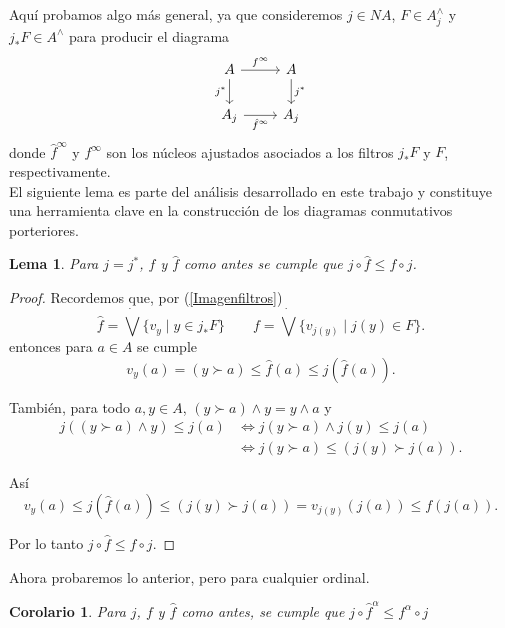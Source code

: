 \documentclass[11pt]{amsart}
\theoremstyle{plain}
\newtheorem{cor}[thm]{Corolario}
\newtheorem{lem}[thm]{Lema}
\theoremstyle{definition}
\begin{document}
Aquí probamos algo más general, ya que consideremos $j\in NA$, $F\in A_j^\wedge$ y $j_*F\in A^\wedge$ para producir el diagrama
\[\begin{tikzcd}
	A & A \\
	{A_j} & {A_j}
	\arrow["{f^\infty}", from=1-1, to=1-2]
	\arrow["j^*"', from=1-1, to=2-1]
	\arrow["j^*", from=1-2, to=2-2]
	\arrow["{\hat{f}^\infty}"', from=2-1, to=2-2]
\end{tikzcd}\]
donde $\hat{f}^\infty$ y $f^\infty$ son los núcleos ajustados asociados a los filtros $j_*F$ y $F$, respectivamente.\\

El siguiente lema es parte del análisis desarrollado en este trabajo y constituye una herramienta clave en la construcción de los diagramas conmutativos
porteriores.

\begin{lem}\label{f1f}
    Para $j=j^*$, $f$ y $\hat{f}$ como antes se cumple que $j\circ \hat{f}\leq f\circ j$.
\end{lem}
\begin{proof}
    Recordemos que, por (\ref{Imagenfiltros})
    \[
    \hat{f}=\dot{\bigvee}\{v_y\mid y\in j_*F\} \qquad f=\dot{\bigvee}\{v_{j(y)}\mid j(y)\in F\}. 
    \]
entonces para $a\in A$ se cumple
\[
v_y(a)=(y\succ a)\leq \hat{f}(a)\leq j(\hat{f}(a)).
\]

También, para todo $a, y\in A$, $(y\succ a)\wedge y=y\wedge a$ y
\[
\begin{split}
j((y\succ a)\wedge y)\leq j(a) & \Leftrightarrow j(y\succ a)\wedge j(y)\leq j(a)\\
& \Leftrightarrow j(y\succ a)\leq (j(y)\succ j(a)).
\end{split}
\]

Así 
\[
v_y(a)\leq j(\hat{f}(a))\leq (j(y)\succ j(a))=v_{j(y)}(j(a))\leq f(j(a)).
\]

Por lo tanto $j\circ \hat{f}\leq f\circ j$.
\end{proof}

Ahora probaremos lo anterior, pero para cualquier ordinal.

\begin{cor}\label{finftyf}
    Para $j$, $f$ y $\hat{f}$ como antes, se cumple que $j\circ \hat{f}^\alpha\leq f^\alpha\circ j$
\end{cor}
\end{document}
